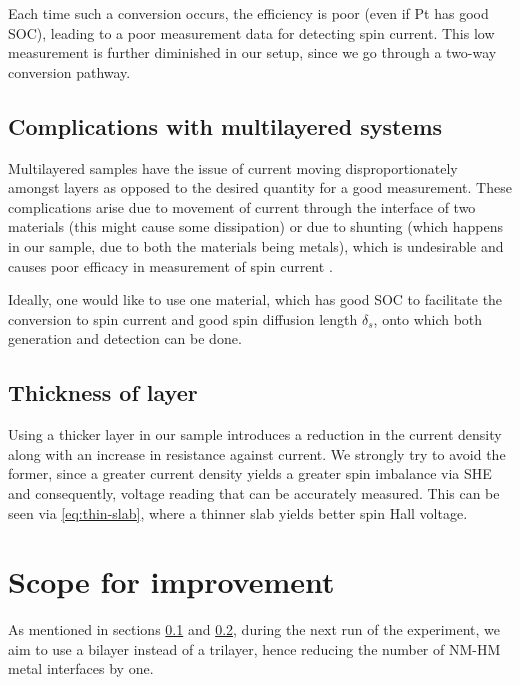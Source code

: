 Each time such a conversion occurs, the efficiency is poor (even if Pt has good SOC), leading to a poor measurement data for detecting spin current. This low measurement is further diminished in our setup, since we go through a two-way conversion pathway.

\subsection{Complications with multilayered systems}

\label{subsec:multilayer}

Multilayered samples have the issue of current moving disproportionately amongst layers as opposed to the desired quantity for a good measurement.
These complications arise due to movement of current through the interface of two materials (this might cause some dissipation) or due to shunting (which happens in our sample, due to both the materials being metals), which is undesirable and causes poor efficacy in measurement of spin current \cite{maekawa2017spin}.

Ideally, one would like to use one material, which has good SOC to facilitate the conversion to spin current and good spin diffusion length \( \delta_s \), onto which both generation and detection can be done.

\subsection{Thickness of layer}

\label{subsec:thickness}

Using a thicker layer in our sample introduces a reduction in the current density along with an increase in resistance against current.
We strongly try to avoid the former, since a greater current density yields a greater spin imbalance via SHE and consequently, voltage reading that can be accurately measured.
This can be seen via \cref{eq:thin-slab}, where a thinner slab yields better spin Hall voltage.

\section{Scope for improvement}

As mentioned in sections \ref{subsec:multilayer} and \ref{subsec:thickness}, during the next run of the experiment, we aim to use a bilayer instead of a trilayer, hence reducing the number of NM-HM metal interfaces by one.

